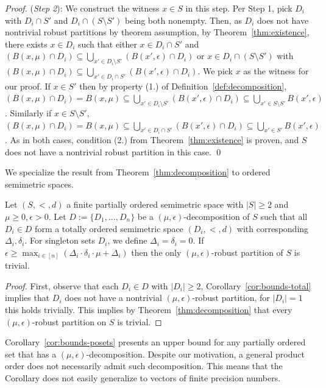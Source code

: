 \begin{proof}
    (\emph{Step 2}): 
    We construct the witness $x \in S$ in this step. Per Step 1, pick $D_i$ with $D_i \cap S'$ and $D_i \cap (S \setminus S')$ being both nonempty. Then, as $D_i$ does not have nontrivial robust partitions by theorem assumption, by Theorem~\ref{thm:existence}, there exists $x \in D_i$ such that either $x \in D_i \cap S'$ and $(B(x,\mu) \cap D_i) \subseteq \bigcup_{x' \in D_i \setminus S'} (B(x', \epsilon) \cap D_i)$ or $x \in D_i \cap (S \setminus S')$ with $(B(x,\mu) \cap D_i) \subseteq \bigcup_{x' \in D_i \cap S'} (B(x', \epsilon) \cap D_i)$. We pick $x$ as the witness for our proof. If $x \in S'$ then by property (1.) of Definition~\ref{def:decomposition}, $(B(x,\mu) \cap D_i) = B(x, \mu) \subseteq \bigcup_{x' \in D_i \setminus S'} (B(x', \epsilon) \cap D_i) \subseteq \bigcup_{x' \in S \setminus S'} B(x', \epsilon)$. Similarly if $x \in S \setminus S'$, $(B(x,\mu) \cap D_i) = B(x, \mu) \subseteq \bigcup_{x' \in D_i \cap S'} (B(x', \epsilon) \cap D_i) \subseteq \bigcup_{x' \in S'} B(x', \epsilon)$ . As in both cases, condition (2.) from Theorem~\ref{thm:existence} is proven, and $S$ does not have a nontrivial robust partition in this case.
    \qed
\end{proof}

We specialize the result from Theorem~\ref{thm:decomposition} to ordered semimetric spaces.

\begin{corollary}
    \label{cor:bounds-posets}
    Let $(S, <, d)$ a finite partially ordered semimetric space with $|S| \geq 2$ and $\mu \geq 0, \epsilon > 0$. Let $D := \{D_1, \dots, D_n\}$ be a $(\mu, \epsilon)$-decomposition of $S$ such that all $D_i \in D$ form a totally ordered semimetric space $(D_i, <, d)$ with corresponding $\Delta_i, \delta_i$. For singleton sets $D_i$, we define $\Delta_i = \delta_i = 0$. If $\epsilon \geq \max_{i \in [n]}(\Delta_i \cdot \delta_i \cdot \mu + \Delta_i)$ then the only $(\mu, \epsilon)$-robust partition of $S$ is trivial.
\end{corollary}
\begin{proof}
    First, observe that each $D_i \in D$ with $|D_i| \geq 2$, Corollary~\ref{cor:bounds-total} implies that $D_i$ does not have a nontrivial $(\mu, \epsilon)$-robust partition, for $|D_i| = 1$ this holds trivially. This implies by Theorem~\ref{thm:decomposition} that every $(\mu, \epsilon)$-robust partition on $S$ is trivial.
\end{proof}

Corollary~\ref{cor:bounds-posets} presents an upper bound for any partially ordered set that has a $(\mu,\epsilon)$-decomposition. Despite our motivation, a general product order does not necessarily admit such decomposition. This means that the Corollary does not easily generalize to vectors of finite precision numbers.
